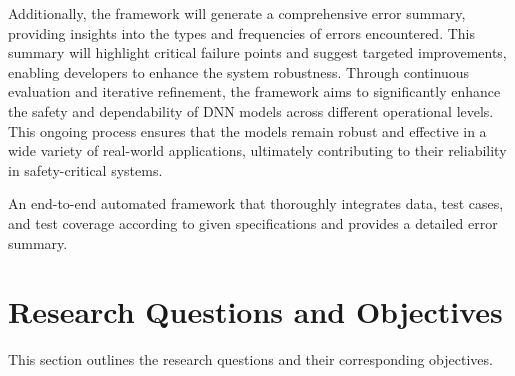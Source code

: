 Additionally, the framework will generate a comprehensive error summary, providing insights into the types and frequencies of errors encountered. This summary will highlight critical failure points and suggest targeted improvements, enabling developers to enhance the system robustness.
Through continuous evaluation and iterative refinement, the framework aims to significantly enhance the safety and dependability of DNN models across different operational levels. This ongoing process ensures that the models remain robust and effective in a wide variety of real-world applications, ultimately contributing to their reliability in safety-critical systems.

\begin{tcolorbox}[colback=purple!2!white, colframe=purple,title= Thesis Goal]
   An end-to-end automated framework that thoroughly integrates data, test cases, and test coverage according to given specifications and provides a detailed error summary.
\end{tcolorbox}

\section{Research Questions and Objectives}
\label{Research Questions and Objectives}
This section outlines the research questions and their corresponding objectives.



